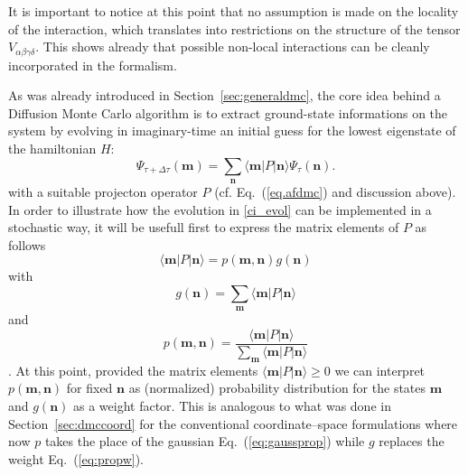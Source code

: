 It is important to notice at this point that no assumption is made on the locality of the 
interaction, which translates into restrictions on the structure of the tensor $V_{\alpha\beta\gamma\delta}$. This 
shows already that possible non-local interactions can be cleanly incorporated in the formalism.

As was already introduced in Section~\ref{sec:generaldmc}, the core idea behind a Diffusion Monte Carlo algorithm is
to extract ground-state informations on the system by evolving in imaginary-time an initial guess for the lowest
eigenstate of the hamiltonian $H$: 
\begin{equation}
\label{ci_evol}
\Psi_{\tau + \Delta\tau} (\mathbf{m}) = \sum_{\mathbf{n}} \langle \mathbf{m} \lvert P \rvert \mathbf{n} \rangle \Psi_{\tau} (\mathbf{n}) .
\end{equation}
with a suitable projecton operator $P$ (cf. Eq.~(\eqref{eq.afdmc}) and discussion above). 
In order to illustrate how the evolution in \eqref{ci_evol} can be implemented in a stochastic way, it will be usefull
first to express the matrix elements of $P$ as follows
\begin{equation}
\langle \mathbf{m} \lvert P \rvert \mathbf{n} \rangle = p(\mathbf{m},\mathbf{n}) g(\mathbf{n})
\end{equation}
with
\begin{equation}
\label{eq:CIMC_branching_factor}
g(\mathbf{n}) = \sum_{\mathbf{m}} \langle \mathbf{m} \lvert P \rvert \mathbf{n} \rangle 
\end{equation}
and
\begin{equation}
\label{eq:CIMC_prob}
p(\mathbf{m},\mathbf{n}) = \frac{\langle \mathbf{m} \lvert P \rvert \mathbf{n} \rangle}{\sum_{\mathbf{m}} \langle \mathbf{m} \lvert P \rvert \mathbf{n} \rangle }
\end{equation}.
At this point, provided the matrix elements $\langle \mathbf{m} \lvert P \rvert \mathbf{n} \rangle \geq 0$ we can interpret 
$p(\mathbf{m},\mathbf{n})$ for fixed $\mathbf{n}$ as (normalized) probability distribution for the states $\mathbf{m}$ and 
$g(\mathbf{n})$ as a weight factor. This is analogous to what was done in Section~\ref{sec:dmccoord} for the conventional coordinate--space formulations  
where now $p$ takes the place of the gaussian Eq.~(\eqref{eq:gaussprop}) while $g$ replaces the weight Eq.~(\eqref{eq:propw}).

